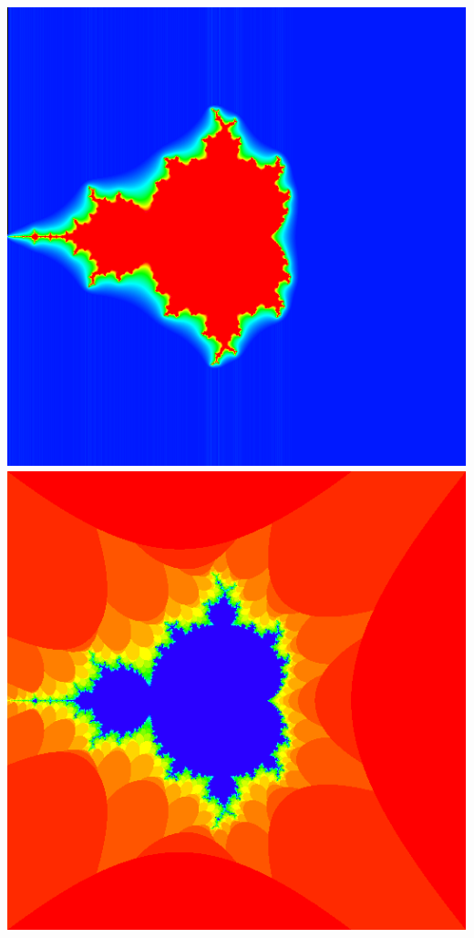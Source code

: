 \documentclass[../resume.tex]{subfiles}
\begin{document}
\includegraphics[scale=0.15]{../TAing/mandel/11.png}
\includegraphics[scale=0.15]{../TAing/mandel/brot.png}
\end{document}
